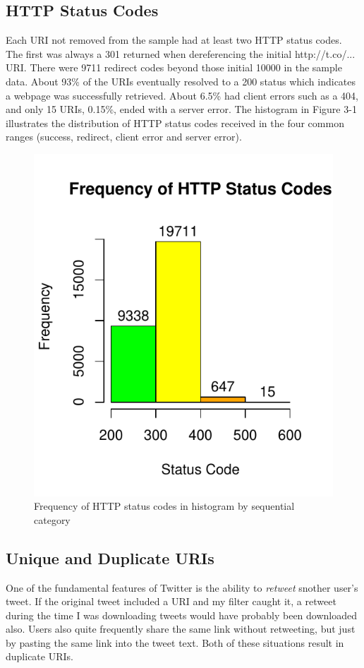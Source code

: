 \documentclass[a4paper,12pt]{article}
\begin{document}
\subsection{HTTP Status Codes}
Each URI not removed from the sample had at least two HTTP status codes. The first was always a 301
returned when dereferencing the initial http://t.co/... URI. There were 9711 redirect codes beyond
those initial 10000 in the sample data. About 93\% of the URIs eventually resolved to a 200 status
which indicates a webpage was successfully retrieved. About 6.5\% had client errors such as a 404,
and only 15 URIs, 0.15\%, ended with a server error. The histogram in Figure 3-1 illustrates the
distribution of HTTP status codes received in the four common ranges (success, redirect, client error
and server error).
\begin{figure}[H]
    \centering
    \includegraphics{stats/http_status_codes.pdf}
    \caption{Frequency of HTTP status codes in histogram by sequential category}
\end{figure}

\subsection{Unique and Duplicate URIs}
One of the fundamental features of Twitter is the ability to \emph{retweet} snother user's tweet.
If the original tweet included a URI and my filter caught it, a retweet during the time I was
downloading tweets would have probably been downloaded also. Users also quite frequently share the
same link without retweeting, but just by pasting the same link into the tweet text. Both of these
situations result in duplicate URIs.
\end{document}
